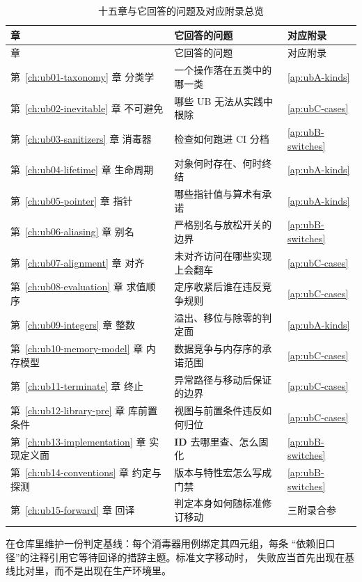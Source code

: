 \documentclass[12pt,a4paper,fontset=fandol]{ctexbook}
\newcommand{\IDB}{\textbf{\textsf{ID}}}
\begin{document}
\begin{longtable}{@{}>{\raggedright\arraybackslash}p{} >{\raggedright\arraybackslash}p{} >{\raggedright\arraybackslash}p{}@{}}
\caption{十五章与它回答的问题及对应附录总览}\label{tab:ub15-map}\\
\toprule
章 & 它回答的问题 & 对应附录 \\
\midrule
\endfirsthead
\toprule
章 & 它回答的问题 & 对应附录 \\
\midrule
\endhead
\bottomrule
\endfoot
第~\ref{ch:ub01-taxonomy} 章 分类学 & 一个操作落在五类中的哪一类 & \ref{ap:ubA-kinds} \\
第~\ref{ch:ub02-inevitable} 章 不可避免 & 哪些 UB 无法从实践中根除 & \ref{ap:ubC-cases} \\
第~\ref{ch:ub03-sanitizers} 章 消毒器 & 检查如何跑进 CI 分档 & \ref{ap:ubB-switches} \\
第~\ref{ch:ub04-lifetime} 章 生命周期 & 对象何时存在、何时终结 & \ref{ap:ubA-kinds} \\
第~\ref{ch:ub05-pointer} 章 指针 & 哪些指针值与算术有承诺 & \ref{ap:ubA-kinds} \\
第~\ref{ch:ub06-aliasing} 章 别名 & 严格别名与放松开关的边界 & \ref{ap:ubB-switches} \\
第~\ref{ch:ub07-alignment} 章 对齐 & 未对齐访问在哪些实现上会翻车 & \ref{ap:ubC-cases} \\
第~\ref{ch:ub08-evaluation} 章 求值顺序 & 定序收紧后谁在违反竞争规则 & \ref{ap:ubC-cases} \\
第~\ref{ch:ub09-integers} 章 整数 & 溢出、移位与除零的判定面 & \ref{ap:ubA-kinds} \\
第~\ref{ch:ub10-memory-model} 章 内存模型 & 数据竞争与内存序的承诺范围 & \ref{ap:ubC-cases} \\
第~\ref{ch:ub11-terminate} 章 终止 & 异常路径与移动后保证的边界 & \ref{ap:ubC-cases} \\
第~\ref{ch:ub12-library-pre} 章 库前置条件 & 视图与前置条件违反如何归位 & \ref{ap:ubC-cases} \\
第~\ref{ch:ub13-implementation} 章 实现定义面 & \IDB{} 去哪里查、怎么固化 & \ref{ap:ubB-switches} \\
第~\ref{ch:ub14-conventions} 章 约定与探测 & 版本与特性宏怎么写成门禁 & \ref{ap:ubB-switches} \\
第~\ref{ch:ub15-forward} 章 回译 & 判定本身如何随标准修订移动 & 三附录合参 \\
\end{longtable}

\begin{bestpractice}[title=把本章装进代码库]
在仓库里维护一份判定基线：每个消毒器用例绑定其四元组，每条
“依赖旧口径”的注释引用它等待回译的措辞主题。标准文字移动时，
失败应当首先出现在基线比对里，而不是出现在生产环境里。
\end{bestpractice}
\end{document}
